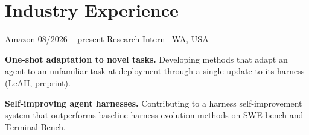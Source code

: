 \section{Industry Experience}
\CVEntry
  {Amazon}
  {08/2026 -- present}
  {Research Intern \textnormal{\textperiodcentered}\ WA, USA}
\begin{CVHighlights}
  \item \textbf{One-shot adaptation to novel tasks.}
    Developing methods that adapt an agent to an unfamiliar task at deployment
    through a single update to its harness (\href{https://ndrsn0208.github.io/papers/learning-to-adapt-harnesses.pdf}{LeAH}, preprint).
  \item \textbf{Self-improving agent harnesses.}
    Contributing to a harness self-improvement system that outperforms baseline
    harness-evolution methods on SWE-bench and Terminal-Bench.
\end{CVHighlights}
\CVGap
